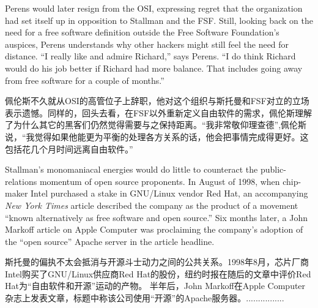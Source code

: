 
\ifdefined\eng
Perens would later resign from the OSI, expressing regret that the organization had set itself up in opposition to Stallman and the FSF. Still, looking back on the need for a free software definition outside the Free Software Foundation's auspices, Perens understands why other hackers might still feel the need for distance. ``I really like and admire Richard,'' says Perens. ``I do think Richard would do his job better if Richard had more balance. That includes going away from free software for a couple of months.''
\fi

\ifdefined\chs
佩伦斯不久就从OSI的高管位子上辞职，他对这个组织与斯托曼和FSF对立的立场表示遗憾。同样的，回头去看，在FSF以外重新定义自由软件的需求，佩伦斯理解了为什么其它的黑客们仍然觉得需要与之保持距离。``我非常敬仰理查德'',佩伦斯说，``我觉得如果他能更为平衡的处理各方关系的话，他会把事情完成得更好。这包括花几个月时间远离自由软件。''
\fi

\ifdefined\eng
Stallman's monomaniacal energies would do little to counteract the public-relations momentum of open source proponents. In August of 1998, when chip-maker Intel purchased a stake in GNU/Linux vendor Red Hat, an accompanying \textit{New York Times} article described the company as the product of a movement ``known alternatively as free software and open source.'' Six months later, a John Markoff article on Apple Computer was proclaiming the company's adoption of the ``open source'' Apache server in the article headline.
\fi

\ifdefined\chs
斯托曼的偏执不太会抵消与开源斗士动力之间的公共关系。1998年8月，芯片厂商Intel购买了GNU/Linux供应商Red Hat的股份，纽约时报在随后的文章中评价Red Hat为``自由软件和开源''运动的产物。 半年后，John Markoff在Apple Computer杂志上发表文章，标题中称该公司使用``开源''的Apache服务器。................
\fi

